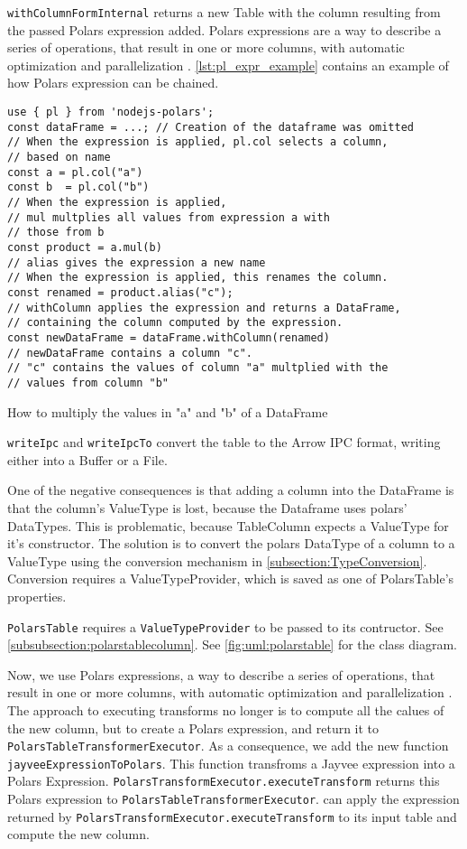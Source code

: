 \Verb|withColumnFormInternal| returns a new Table with the column resulting from the passed Polars expression added.
Polars expressions are a way to describe a series of operations, that result in one or more columns, with automatic optimization and parallelization \autocite{polars:docs:expr}.
\ref{lst:pl_expr_example} contains an example of how Polars expression can be chained.
\begin{listing}
	\begin{verbatim}
use { pl } from 'nodejs-polars';
const dataFrame = ...; // Creation of the dataframe was omitted
// When the expression is applied, pl.col selects a column,
// based on name
const a = pl.col("a")
const b  = pl.col("b")
// When the expression is applied,
// mul multplies all values from expression a with
// those from b
const product = a.mul(b)
// alias gives the expression a new name
// When the expression is applied, this renames the column.
const renamed = product.alias("c");
// withColumn applies the expression and returns a DataFrame,
// containing the column computed by the expression.
const newDataFrame = dataFrame.withColumn(renamed)
// newDataFrame contains a column "c".
// "c" contains the values of column "a" multplied with the
// values from column "b"
	\end{verbatim}
	\caption{How to multiply the values in "a" and "b" of a DataFrame}
	\label{lst:pl_expr_example}
\end{listing}

\Verb|writeIpc| and \Verb|writeIpcTo| convert the table to the Arrow \ac{IPC} format, writing either into a Buffer or a File.

One of the negative consequences is that adding a column into the DataFrame is that the column's ValueType is lost, because the Dataframe uses polars' DataTypes.
This is problematic, because TableColumn expects a ValueType for it's constructor.
The solution is to convert the polars DataType of a column to a ValueType using the conversion mechanism in \ref{subsection:TypeConversion}.
Conversion requires a ValueTypeProvider, which is saved as one of PolarsTable's properties.

\Verb|PolarsTable| requires a \Verb|ValueTypeProvider|
to be passed to its contructor. See \ref{subsubsection:polarstablecolumn}.
See \ref{fig:uml:polarstable} for the class diagram.

\Ver
Now, we use Polars expressions, a way to describe a series of operations, that result in one or more columns, with automatic optimization and parallelization \autocite{polars:docs:expr}.
The approach to executing transforms no longer is to compute all the calues of the new column, but to create a Polars expression, and return it to \Verb|PolarsTableTransformerExecutor|.
As a consequence, we add the new function \Verb|jayveeExpressionToPolars|.
This function transfroms a Jayvee expression into a Polars Expression.
\Verb|PolarsTransformExecutor.executeTransform| returns this Polars expression to \Verb|PolarsTableTransformerExecutor|.
can apply the expression returned by \Verb|PolarsTransformExecutor.executeTransform| to its input table and compute the new column.



